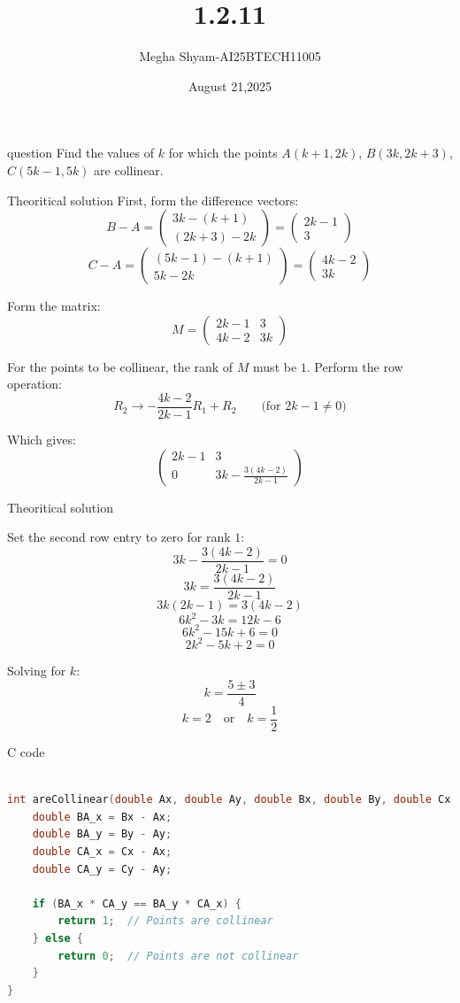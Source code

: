 \documentclass{beamer}
\title %
{1.2.11}
\date{August 21,2025}
\author %
{Megha Shyam-AI25BTECH11005}
\begin{document}
\begin{frame}{question}
Find the values of $k$ for which the points $A(k+1, 2k)$, $B(3k, 2k+3)$, $C(5k-1, 5k)$ are collinear. 
\end{frame}
\begin{frame}{Theoritical solution}
    First, form the difference vectors:
\[
 B - A = 
\begin{pmatrix}
3k - (k+1) \\ (2k+3) - 2k
\end{pmatrix}
=
\begin{pmatrix}
2k - 1 \\ 3
\end{pmatrix}
\]
\[
 C - A =
\begin{pmatrix}
(5k-1) - (k+1) \\ 5k - 2k
\end{pmatrix}
=
\begin{pmatrix}
4k - 2 \\ 3k
\end{pmatrix}
\]

Form the matrix:
\[
M = \begin{pmatrix}
2k-1 & 3 \\
4k-2 & 3k
\end{pmatrix}
\]

For the points to be collinear, the rank of $M$ must be $1$. Perform the row operation:
\[
R_2 \to -\frac{4k-2}{2k-1}R_1 + R_2 \qquad \text{(for $2k-1 \neq 0$)}
\]

Which gives:
\[
\begin{pmatrix}
2k-1 & 3 \\
0 & 3k - \frac{3(4k-2)}{2k-1}
\end{pmatrix}
\]
\end{frame}
\begin{frame}{Theoritical solution}
    

Set the second row entry to zero for rank $1$:
\[
3k - \frac{3(4k-2)}{2k-1} = 0
\]
\[
3k = \frac{3(4k-2)}{2k-1}
\]
\[
3k(2k-1) = 3(4k-2)
\]
\[
6k^2 - 3k = 12k - 6
\]
\[
6k^2 - 15k + 6 = 0
\]
\[
2k^2 - 5k + 2 = 0
\]

Solving for $k$:
\[
k = \frac{5 \pm 3}{4}
\]
\[
k = 2 \quad \text{or} \quad k = \frac{1}{2}
\]


\end{frame}
\begin{frame}[fragile]{C code}
\begin{lstlisting}[language=C]

int areCollinear(double Ax, double Ay, double Bx, double By, double Cx, double Cy) {
    double BA_x = Bx - Ax;
    double BA_y = By - Ay;
    double CA_x = Cx - Ax;
    double CA_y = Cy - Ay;

    if (BA_x * CA_y == BA_y * CA_x) {
        return 1;  // Points are collinear
    } else {
        return 0;  // Points are not collinear
    }
}


\end{lstlisting}
\end{frame}
\end{document}
